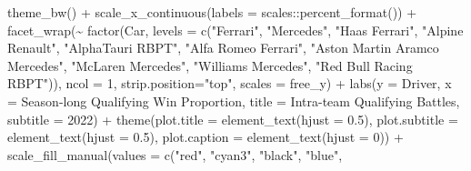 \documentclass[
]{book}
\newenvironment{Shaded}{\begin{snugshade}}{\end{snugshade}}
\newcommand{\AttributeTok}[1]{\textcolor[rgb]{0.77,0.63,0.00}{#1}}
\newcommand{\DecValTok}[1]{\textcolor[rgb]{0.00,0.00,0.81}{#1}}
\newcommand{\FloatTok}[1]{\textcolor[rgb]{0.00,0.00,0.81}{#1}}
\newcommand{\FunctionTok}[1]{\textcolor[rgb]{0.00,0.00,0.00}{#1}}
\newcommand{\NormalTok}[1]{#1}
\newcommand{\SpecialCharTok}[1]{\textcolor[rgb]{0.00,0.00,0.00}{#1}}
\newcommand{\StringTok}[1]{\textcolor[rgb]{0.31,0.60,0.02}{#1}}
\begin{document}
\begin{Shaded}
\begin{Highlighting}[]
  \FunctionTok{theme\_bw}\NormalTok{() }\SpecialCharTok{+}
  \FunctionTok{scale\_x\_continuous}\NormalTok{(}\AttributeTok{labels =}\NormalTok{ scales}\SpecialCharTok{::}\FunctionTok{percent\_format}\NormalTok{()) }\SpecialCharTok{+}
  \FunctionTok{facet\_wrap}\NormalTok{(}\SpecialCharTok{\textasciitilde{}} \FunctionTok{factor}\NormalTok{(Car,}
                      \AttributeTok{levels =} \FunctionTok{c}\NormalTok{(}\StringTok{"Ferrari"}\NormalTok{,}
                                 \StringTok{"Mercedes"}\NormalTok{,}
                                 \StringTok{"Haas Ferrari"}\NormalTok{,}
                                 \StringTok{"Alpine Renault"}\NormalTok{,}
                                 \StringTok{"AlphaTauri RBPT"}\NormalTok{,}
                                 \StringTok{"Alfa Romeo Ferrari"}\NormalTok{, }
                                 \StringTok{"Aston Martin Aramco Mercedes"}\NormalTok{,}
                                 \StringTok{"McLaren Mercedes"}\NormalTok{,}
                                 \StringTok{"Williams Mercedes"}\NormalTok{,}
                                 \StringTok{"Red Bull Racing RBPT"}\NormalTok{)),}
                      \AttributeTok{ncol =} \DecValTok{1}\NormalTok{, }\AttributeTok{strip.position=}\StringTok{"top"}\NormalTok{, }\AttributeTok{scales =} \StringTok{\textquotesingle{}free\_y\textquotesingle{}}\NormalTok{) }\SpecialCharTok{+}
  \FunctionTok{labs}\NormalTok{(}\AttributeTok{y =} \StringTok{\textquotesingle{}Driver\textquotesingle{}}\NormalTok{,}
       \AttributeTok{x =} \StringTok{\textquotesingle{}Season{-}long Qualifying Win Proportion\textquotesingle{}}\NormalTok{,}
       \AttributeTok{title =} \StringTok{\textquotesingle{}Intra{-}team Qualifying Battles\textquotesingle{}}\NormalTok{,}
       \AttributeTok{subtitle =} \StringTok{\textquotesingle{}2022\textquotesingle{}}\NormalTok{) }\SpecialCharTok{+}
  \FunctionTok{theme}\NormalTok{(}\AttributeTok{plot.title =} \FunctionTok{element\_text}\NormalTok{(}\AttributeTok{hjust =} \FloatTok{0.5}\NormalTok{),}
        \AttributeTok{plot.subtitle =} \FunctionTok{element\_text}\NormalTok{(}\AttributeTok{hjust =} \FloatTok{0.5}\NormalTok{),}
        \AttributeTok{plot.caption =} \FunctionTok{element\_text}\NormalTok{(}\AttributeTok{hjust =} \DecValTok{0}\NormalTok{)) }\SpecialCharTok{+}
  \FunctionTok{scale\_fill\_manual}\NormalTok{(}\AttributeTok{values =} \FunctionTok{c}\NormalTok{(}\StringTok{"red"}\NormalTok{, }
                                \StringTok{"cyan3"}\NormalTok{,  }
                                \StringTok{"black"}\NormalTok{, }
                                \StringTok{"blue"}\NormalTok{,}

\end{Highlighting}
\end{Shaded}
\end{document}
